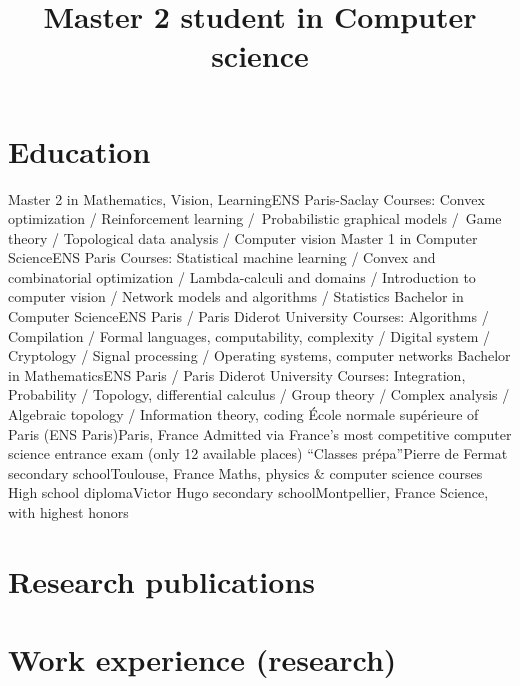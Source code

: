 \documentclass[colorlinks,linkcolor=true]{moderncv}
\title{Master 2 student in Computer science}
\begin{document}
\makecvtitle

\section{Education}

{Master 2 in Mathematics, Vision, Learning}{ENS Paris-Saclay}{}{}
{Courses: Convex optimization / Reinforcement learning /\ Probabilistic graphical models /\  Game theory / Topological data analysis / Computer vision}
{Master 1 in Computer Science}{ENS Paris}{}{}
{Courses: Statistical machine learning / Convex and combinatorial optimization / Lambda-calculi and domains / Introduction to computer vision / Network models and algorithms / Statistics}
{Bachelor in Computer Science}{ENS Paris / Paris Diderot University}{}{}
{Courses: Algorithms / Compilation / Formal languages, computability, complexity / Digital system / Cryptology / Signal processing / Operating systems, computer networks}
{Bachelor in Mathematics}{ENS Paris / Paris Diderot University}{}{}
{Courses: Integration, Probability / Topology, differential calculus / Group theory / Complex analysis / Algebraic topology / Information theory, coding}
{École normale supérieure of Paris (ENS Paris)}{}{Paris, France}{}
{Admitted via France's most competitive computer science entrance exam (only 12 available places)}
{``Classes prépa''}{Pierre de Fermat secondary school}{Toulouse, France}{}
{Maths, physics \& computer science courses}
{High school diploma}{Victor Hugo secondary school}{Montpellier, France}{}
{Science, with highest honors}

\section{Research publications}


\section{Work experience (research)}
\end{document}
